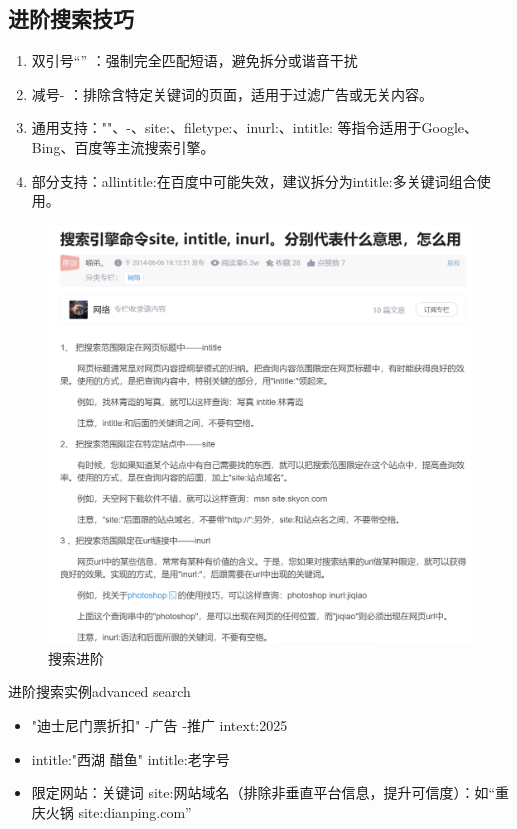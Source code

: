 \documentclass{amznotes}
\begin{document}
\subsection{进阶搜索技巧}
\begin{enumerate}
  \item 双引号“”  ：强制完全匹配短语，避免拆分或谐音干扰
  \item 减号-    ：排除含特定关键词的页面，适用于过滤广告或无关内容。
  \item 通用支持：""、-、site:、filetype:、inurl:、intitle: 等指令适用于Google、Bing、百度等主流搜索引擎。
  \item 部分支持：allintitle:在百度中可能失效，建议拆分为intitle:多关键词组合使用。
\end{enumerate}
\begin{figure}[H]
  \centering
  \includegraphics[width=.8\textwidth]{./figures/生活/示例2.png}
  \caption{搜索进阶}
\end{figure}
\begin{exbox}{进阶搜索实例}{advanced search}
  \begin{itemize}
    \item "迪士尼门票折扣" -广告 -推广 intext:2025

    \item intitle:"西湖 醋鱼" intitle:老字号

    \item 限定网站：关键词 site:网站域名（排除非垂直平台信息，提升可信度）：如“重庆火锅 site:dianping.com”
  \end{itemize}
\end{exbox}
\end{document}
